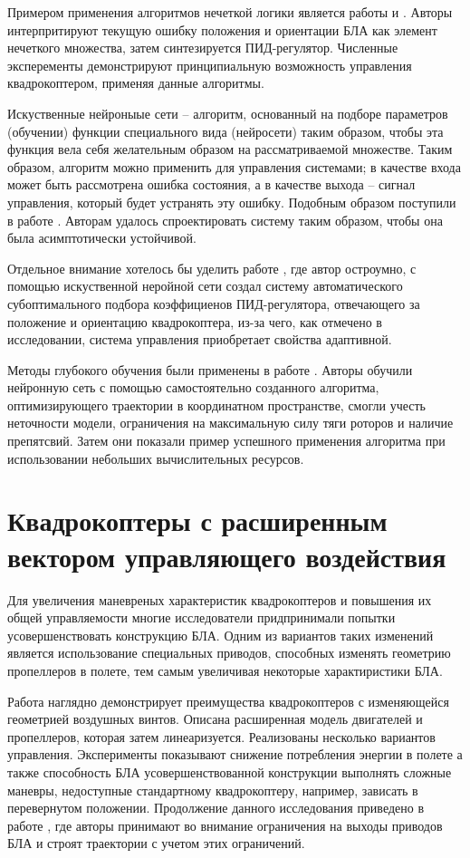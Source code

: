 Примером применения алгоритмов нечеткой логики является работы \cite{Dierks01} и \cite{Santos01}. Авторы интерпритируют текущую ошибку положения и ориентации БЛА как элемент нечеткого множества, затем синтезируется ПИД-регулятор. Численные эксперементы демонстрируют принципиальную возможность управления квадрокоптером, применяя данные алгоритмы.

Искуственные нейроныые сети -- алгоритм, основанный на подборе параметров (обучении) функции специального вида (нейросети) таким образом, чтобы эта функция вела себя желательным образом на рассматриваемой множестве. Таким образом, алгоритм можно применить для управления системами; в качестве входа может быть рассмотрена ошибка состояния, а в качестве выхода -- сигнал управления, который будет устранять эту ошибку. Подобным образом поступили в работе \cite{Nicol01}. Авторам удалось спроектировать систему таким образом, чтобы она была асимптотически устойчивой.

Отдельное внимание хотелось бы уделить работе \cite{Evgenov01}, где автор остроумно, с помощью искуственной неройной сети создал систему автоматического субоптимального подбора коэффициенов ПИД-регулятора, отвечающего за положение и ориентацию квадрокоптера, из-за чего, как отмечено в исследовании, система управления приобретает свойства адаптивной.

Методы глубокого обучения были применены в работе \cite{Andersson01}. Авторы обучили нейронную сеть с помощью самостоятельно созданного алгоритма, оптимизирующего траектории в координатном пространстве, смогли учесть неточности модели, ограничения на максимальную силу тяги роторов и наличие препятсвий.
Затем они показали пример успешного применения алгоритма при использовании небольших вычислительных ресурсов.

\section{Квадрокоптеры с расширенным вектором управляющего воздействия}

Для увеличения маневреных характеристик квадрокоптеров и повышения их общей управляемости многие исследователи придпринимали попытки усовершенствовать конструкцию БЛА. Одним из вариантов таких изменений является использование специальных приводов, способных изменять геометрию пропеллеров в полете, тем самым увеличивая некоторые характиристики БЛА.


Работа \cite{Cutler01} наглядно демонстрирует преимущества квадрокоптеров с изменяющейся геометрией воздушных винтов. Описана расширенная модель двигателей и пропеллеров, которая затем линеаризуется. Реализованы несколько вариантов управления. Эксперименты показывают снижение потребления энергии в полете а также способность БЛА усовершенствованной конструкции выполнять сложные маневры, недоступные стандартному квадрокоптеру, например, зависать в перевернутом положении. Продолжение данного исследования приведено в работе \cite{Cutler02}, где авторы принимают во внимание ограничения на выходы приводов БЛА и строят траектории с учетом этих ограничений.

